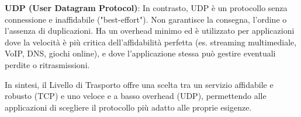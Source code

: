 \textbf{UDP (User Datagram Protocol)}:
In contrasto, UDP è un protocollo senza connessione e inaffidabile ("best-effort"). Non garantisce la consegna, l'ordine o l'assenza di duplicazioni. Ha un overhead minimo ed è utilizzato per applicazioni dove la velocità è più critica dell'affidabilità perfetta (es. streaming multimediale, VoIP, DNS, giochi online), e dove l'applicazione stessa può gestire eventuali perdite o ritrasmissioni.

In sintesi, il Livello di Trasporto offre una scelta tra un servizio affidabile e robusto (TCP) e uno veloce e a basso overhead (UDP), permettendo alle applicazioni di scegliere il protocollo più adatto alle proprie esigenze.